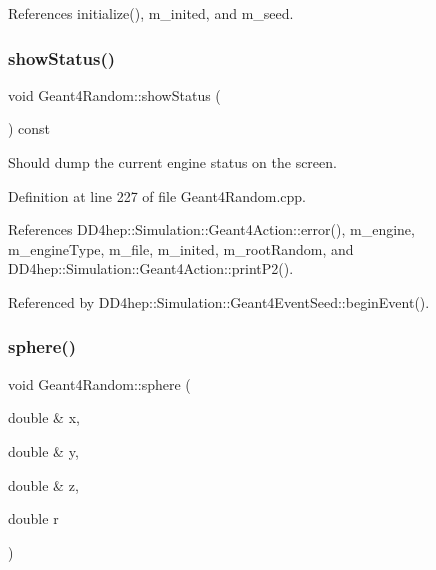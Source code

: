 References initialize(), m\+\_\+inited, and m\+\_\+seed.

\hypertarget{class_d_d4hep_1_1_simulation_1_1_geant4_random_a44d4509bbb3d7800b12a75b2fbc6a066}{}\label{class_d_d4hep_1_1_simulation_1_1_geant4_random_a44d4509bbb3d7800b12a75b2fbc6a066} 
\subsubsection{\texorpdfstring{show\+Status()}{showStatus()}}
{\footnotesize\ttfamily void Geant4\+Random\+::show\+Status (\begin{DoxyParamCaption}{ }\end{DoxyParamCaption}) const\hspace{0.3cm}{\ttfamily [virtual]}}



Should dump the current engine status on the screen. 



Definition at line 227 of file Geant4\+Random.\+cpp.



References D\+D4hep\+::\+Simulation\+::\+Geant4\+Action\+::error(), m\+\_\+engine, m\+\_\+engine\+Type, m\+\_\+file, m\+\_\+inited, m\+\_\+root\+Random, and D\+D4hep\+::\+Simulation\+::\+Geant4\+Action\+::print\+P2().



Referenced by D\+D4hep\+::\+Simulation\+::\+Geant4\+Event\+Seed\+::begin\+Event().

\hypertarget{class_d_d4hep_1_1_simulation_1_1_geant4_random_af0825e540ad54e3510b4e5a1450a3211}{}\label{class_d_d4hep_1_1_simulation_1_1_geant4_random_af0825e540ad54e3510b4e5a1450a3211} 
\subsubsection{\texorpdfstring{sphere()}{sphere()}}
{\footnotesize\ttfamily void Geant4\+Random\+::sphere (\begin{DoxyParamCaption}\item[{double \&}]{x,  }\item[{double \&}]{y,  }\item[{double \&}]{z,  }\item[{double}]{r }\end{DoxyParamCaption})}



